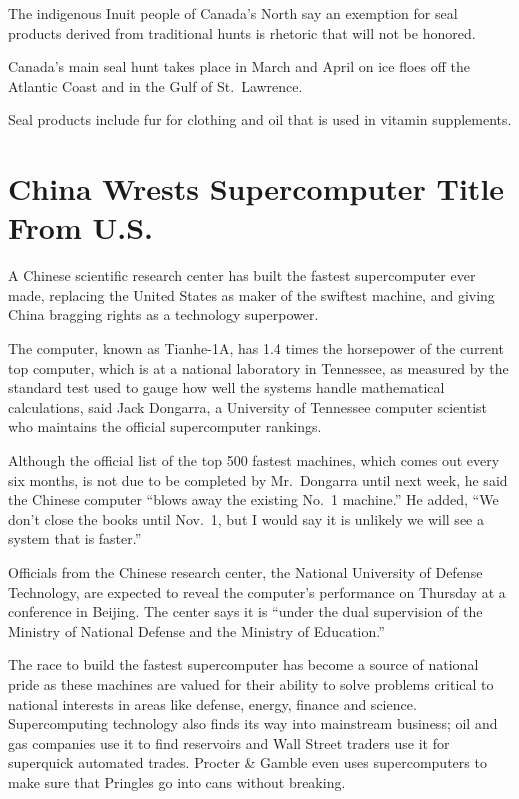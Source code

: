 ﻿\documentclass[12pt]{article}
\begin{document}
The indigenous Inuit people of Canada's North say an exemption for seal products derived from
traditional hunts is rhetoric that will not be honored.

Canada's main seal hunt takes place in March and April on ice floes off the Atlantic Coast and in
the Gulf of St.~Lawrence.

Seal products include fur for clothing and oil that is used in vitamin supplements.

\section{China Wrests Supercomputer Title From U.S.}

\lettrine{A}{} Chinese scientific research center has built the fastest
supercomputer ever made, replacing the United States as maker of the swiftest machine, and giving
China bragging rights as a technology superpower.

The computer, known as Tianhe-1A, has 1.4 times the horsepower of the current top computer, which is
at a national laboratory in Tennessee, as measured by the standard test used to gauge how well the
systems handle mathematical calculations, said Jack Dongarra, a University of Tennessee computer
scientist who maintains the official supercomputer rankings.

Although the official list of the top 500 fastest machines, which comes out every six months, is not
due to be completed by Mr.~Dongarra until next week, he said the Chinese computer ``blows away the
existing No.~1 machine.'' He added, ``We don't close the books until Nov.~1, but I would say it is
unlikely we will see a system that is faster.''

Officials from the Chinese research center, the National University of Defense Technology, are
expected to reveal the computer's performance on Thursday at a conference in Beijing. The center
says it is ``under the dual supervision of the Ministry of National Defense and the Ministry of
Education.''

The race to build the fastest supercomputer has become a source of national pride as these machines
are valued for their ability to solve problems critical to national interests in areas like defense,
energy, finance and science. Supercomputing technology also finds its way into mainstream business;
oil and gas companies use it to find reservoirs and Wall Street traders use it for superquick
automated trades. Procter \& Gamble even uses supercomputers to make sure that Pringles go into cans
without breaking.
\end{document}
